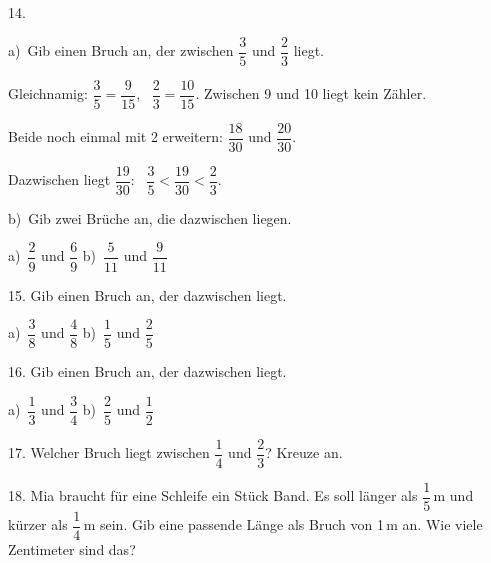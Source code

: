 \documentclass[11pt]{article}
\newcommand{\grau}[1]{{\color{mbgrau}#1}}
\begin{document}
\begin{pfaufg}{}{14.}{}
\grau{a)\ Gib einen Bruch an, der zwischen $\dfrac{3}{5}$ und $\dfrac{2}{3}$ liegt.\par\smallskip Gleichnamig: $\dfrac{3}{5} = \dfrac{9}{15}$, \ $\dfrac{2}{3} = \dfrac{10}{15}$. Zwischen 9 und 10 liegt kein Zähler.\par Beide noch einmal mit 2 erweitern: $\dfrac{18}{30}$ und $\dfrac{20}{30}$.\par Dazwischen liegt $\dfrac{19}{30}$: \ $\dfrac{3}{5} < \dfrac{19}{30} < \dfrac{2}{3}$.}
\par\medskip
b)\ Gib zwei Brüche an, die dazwischen liegen. \par\vspace{3pt} a)~$\dfrac{2}{9}$ und $\dfrac{6}{9}$ \qquad b)~$\dfrac{5}{11}$ und $\dfrac{9}{11}$
\end{pfaufg}

\begin{pfaufg}{}{15.}{}
Gib einen Bruch an, der dazwischen liegt. \par\vspace{3pt} a)~$\dfrac{3}{8}$ und $\dfrac{4}{8}$ \qquad b)~$\dfrac{1}{5}$ und $\dfrac{2}{5}$
\end{pfaufg}

\begin{pfaufg}{}{16.}{}
Gib einen Bruch an, der dazwischen liegt. \par\vspace{3pt} a)~$\dfrac{1}{3}$ und $\dfrac{3}{4}$ \qquad b)~$\dfrac{2}{5}$ und $\dfrac{1}{2}$
\end{pfaufg}

\begin{pfaufg}{}{17.}{}
Welcher Bruch liegt zwischen $\dfrac{1}{4}$ und $\dfrac{2}{3}$? Kreuze an.\par\smallskip {}\par {}
\end{pfaufg}

\begin{pfaufg}{}{18.}{}
Mia braucht für eine Schleife ein Stück Band. Es soll länger als $\dfrac{1}{5}$\,m und kürzer als $\dfrac{1}{4}$\,m sein. Gib eine passende Länge als Bruch von 1\,m an. Wie viele Zentimeter sind das?
\end{pfaufg}
\end{document}
